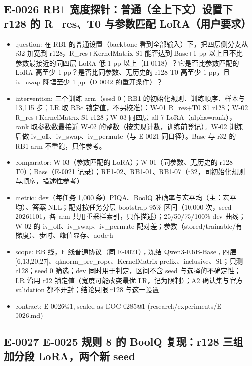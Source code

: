 \documentclass[11pt]{article}
\begin{document}
\subsection*{E-0026 RB1 宽度探针：普通（全上下文）设置下 r128 的 R\_res、T0 与参数匹配 LoRA（用户要求）}

\begin{itemize}
\item question: 在 RB1 的普通设置（backbone 看到全部输入）下，把四层侧分支从 r32 加宽到 r128，R\_res+KernelMatrix S1 能否达到 Base+1 pp 以上且不比参数最接近的同四层 LoRA 低 1 pp 以上（H-0018）？它是否比参数匹配的 LoRA 高至少 1 pp？是否比同参数、无历史的 r128 T0 高至少 1 pp，且 iv\_swap 降幅至少 1 pp（D-0042 的重开条件）？
\item intervention: 三个训练 arm（seed 0；RB1 的初始化规则、训练顺序、样本与 13,115 步；LR 取 RBc 锁定值，不另校准）：W-01 R\_res+T0 S1 r128；W-02 R\_res+KernelMatrix S1 r128；W-03 同四层 all-7 LoRA（alpha=rank），rank 取参数数最接近 W-02 的整数（按实现计数，训练前登记）。W-02 训练后做 iv\_off、iv\_swap、iv\_permute（与 E-0021 同口径）。Base 与 r32 的 RB1 arm 不重跑，只作参考。
\item comparator: W-03（参数匹配的 LoRA）；W-01（同参数、无历史的 r128 T0）；Base（E-0021 记录）；RB1-02、RB1-01、RB1-07（r32，同初始化规则与顺序，描述性参考）
\item metric: dev（每任务 1,000 条）PIQA、BoolQ 准确率与宏平均（主：宏平均）、答案 NLL；配对按任务分层 bootstrap 95\% 区间（10,000 次，seed 20261101，各 arm 共用重采样索引，只作描述）；25/50/75/100\% dev 曲线；W-02 的 iv\_off、iv\_swap、iv\_permute 配对差；参数（stored/trainable/有梯度）、步时、峰值显存、node\ensuremath{\cdot}h
\item scope: RB 线，F 线普通协议（同 E-0021）；冻结 Qwen3-0.6B-Base；四层 [6,13,20,27]、qknorm\_pre\_rope、KernelMatrix prefix、inclusive、S1；只测 r128；seed 0 筛选；dev 同时用于判定，区间不含 seed 与选择的不确定性；LR 沿用 r32 锁定值（宽度可能改变最优 LR，记为限制）；A2 确认集与官方 validation 都不开封；结论只限 r128 与这一设置
\item contract: E-0026@1, sealed as DOC-0285@1 (research/experiments/E-0026.md)
\end{itemize}

\subsection*{E-0027 E-0025 规则 8 的 BoolQ 复现：r128 三组加分段 LoRA，两个新 seed}
\end{document}
